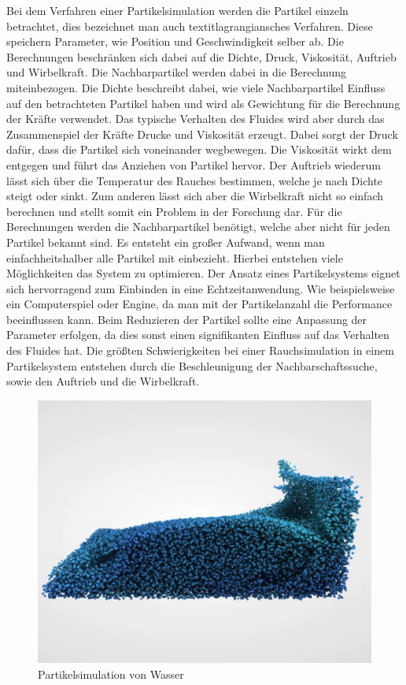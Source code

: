 \documentclass[intern,palatino]{cgBA}
\begin{document}
Bei dem Verfahren einer Partikelsimulation werden die Partikel einzeln betrachtet, dies bezeichnet man auch textit{lagrangiansches Verfahren}. Diese speichern Parameter, wie Position und Geschwindigkeit selber ab. Die Berechnungen beschränken sich dabei auf die Dichte, Druck, Viskosität, Auftrieb und Wirbelkraft.
Die Nachbarpartikel werden dabei in die Berechnung miteinbezogen. Die Dichte beschreibt dabei, wie viele Nachbarpartikel Einfluss auf den betrachteten Partikel haben und wird als Gewichtung für die Berechnung der Kräfte verwendet. Das typische Verhalten des Fluides wird aber durch das Zusammenspiel der Kräfte Drucke und Viskosität erzeugt. Dabei sorgt der Druck dafür, dass die Partikel sich voneinander wegbewegen. Die Viskosität wirkt dem entgegen und führt das Anziehen von Partikel hervor. Der Auftrieb wiederum lässt sich über die Temperatur des Rauches bestimmen, welche je nach Dichte steigt oder sinkt. Zum anderen lässt sich aber die Wirbelkraft nicht so einfach berechnen und stellt somit ein Problem in der Forschung dar.
Für die Berechnungen werden die Nachbarpartikel benötigt, welche aber nicht für jeden Partikel bekannt sind. Es entsteht ein großer Aufwand, wenn man einfachheitshalber alle Partikel mit einbezieht. Hierbei entstehen viele Möglichkeiten das System zu optimieren.
\newline
Der Ansatz eines Partikelsystems eignet sich hervorragend zum Einbinden in eine Echtzeitanwendung. Wie beispielsweise ein Computerspiel oder Engine, da man mit der Partikelanzahl  die Performance beeinflussen kann. Beim Reduzieren der Partikel sollte eine Anpassung der Parameter erfolgen, da dies sonst einen signifikanten Einfluss auf das Verhalten des Fluides hat.
\newline
Die größten Schwierigkeiten bei einer Rauchsimulation in einem Partikelsystem entstehen durch die Beschleunigung der Nachbarschaftssuche, sowie den Auftrieb und die Wirbelkraft.
\begin{figure}[h]
	\centering
	\includegraphics[width=0.7\columnwidth]{Bilder/partikelsystem.jpg}
	\caption[Partikelsimulation von Wasser \newline \url{https://i.ytimg.com/vi/DhNt_A3k4B4/maxresdefault.jpg}]{Partikelsimulation von Wasser}
	\label{img:Partikelsystem}
\end{figure}
\end{document}
